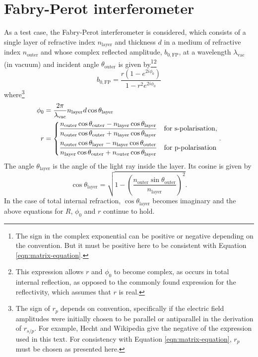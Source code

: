 \documentclass[]{article}
\begin{document}
	\section{Fabry-Perot interferometer}
As a test case, the Fabry-Perot interferometer is considered, which consists of a single layer of refractive index $n_\text{layer}$ and thickness $d$ in a medium of refractive index $n_\text{outer}$ and whose complex reflected amplitude, $b_{0,\text{FP}}$, at a wavelength $\lambda_\text{vac}$ (in vacuum) and incident angle $\theta_\text{outer}$ is given by\footnote{The sign in the complex exponential can be positive or negative depending on the convention. But it must be positive here to be consistent with Equation \ref{eqn:matrix-equation}.}\footnote{This expression allows $r$ and $\phi_0$ to become complex, as occurs in total internal reflection, as opposed to the commonly found expression for the reflectivity, which assumes that $r$ is real.}
\begin{equation}
	b_{0,\text{FP}}=\frac{r(1-e^{2i\phi_0})}{1-r^2 e^{2i\phi_0}}
\end{equation}
where\footnote{The sign of $r_p$ depends on convention, specifically if the electric field amplitudes were initially chosen to be parallel or antiparallel in the derivation of $r_{s/p}$. For example, Hecht and Wikipedia give the negative of the expression used in this text. For consistency with Equation \ref{eqn:matrix-equation}, $r_p$ must be chosen as presented here.}
\begin{align}
	\phi_0&=\frac{2\pi}{\lambda_\text{vac}}n_\text{layer}d\cos\theta_\text{layer}\\
	r&=
	\begin{dcases}
		\frac{n_\text{outer}\cos\theta_\text{outer}-n_\text{layer}\cos\theta_\text{layer}}{n_\text{outer}\cos\theta_\text{outer}+n_\text{layer}\cos\theta_\text{layer}}&\text{for s-polarisation},\\
		\frac{n_\text{outer}\cos\theta_\text{layer}-n_\text{layer}\cos\theta_\text{outer}}{n_\text{layer}\cos\theta_\text{outer}+n_\text{outer}\cos\theta_\text{layer}}&\text{for p-polarisation}
	\end{dcases}.
\end{align}
The angle $\theta_\text{layer}$ is the angle of the light ray inside the layer. Its cosine is given by
\begin{equation}
	\cos\theta_\text{layer}=\sqrt{1-\left(\frac{n_\text{outer}\sin\theta_\text{outer}}{n_\text{layer}}\right)^2}.
\end{equation}
In the case of total internal refraction, $\cos\theta_\text{layer}$ becomes imaginary and the above equations for $R$, $\phi_0$ and $r$ continue to hold.
\end{document}
